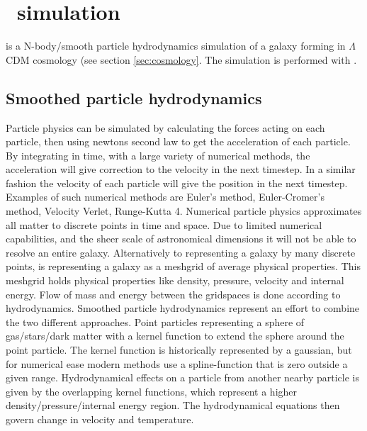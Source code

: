 \section{\eris\ simulation}

\eris{} is a N-body/smooth particle hydrodynamics simulation of a galaxy forming in $\Lambda$CDM cosmology (see section \ref{sec:cosmology}. The simulation is performed with \gasoline{}.

\subsection{Smoothed particle hydrodynamics}
Particle physics can be simulated by calculating the forces acting on each particle, then using newtons second law to get the acceleration of each particle.
By integrating in time, with a large variety of numerical methods, the acceleration will give correction to the velocity in the next timestep.
In a similar fashion the velocity of each particle will give the position in the next timestep.
Examples of such numerical methods are Euler's method, Euler-Cromer's method, Velocity Verlet, Runge-Kutta 4.
Numerical particle physics approximates all matter to discrete points in time and space. Due to limited numerical capabilities, and the sheer scale of astronomical dimensions it will not be able to resolve an entire galaxy.
Alternatively to representing a galaxy by many discrete points, is representing a galaxy as a meshgrid of average physical properties.
This meshgrid holds physical properties like density, pressure, velocity and internal energy. Flow of mass and energy between the gridspaces is done according to hydrodynamics.
Smoothed particle hydrodynamics  represent an effort to combine the two different approaches. Point particles representing a sphere of gas/stars/dark matter with a kernel function to extend the sphere around the point particle.
The kernel function is historically represented by a gaussian, but for numerical ease modern methods use a spline-function that is zero outside a given range.
Hydrodynamical effects on a particle from another nearby particle is given by the overlapping kernel functions, which represent a higher density/pressure/internal energy region. The hydrodynamical equations then govern change in velocity and temperature.

